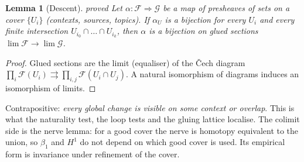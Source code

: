 \documentclass[11pt]{article}
\newtheorem{lemma}[theorem]{Lemma}
\theoremstyle{definition}
\theoremstyle{remark}
\newcommand{\st}[1]{\textsf{\small\color{gray}#1}}
\begin{document}
\begin{lemma}[Descent]\label{lem:descent}\st{proved}
Let $\alpha:\mathcal F\Rightarrow\mathcal G$ be a map of presheaves of sets on a cover $\{U_i\}$ (contexts, sources, topics). If $\alpha_{U}$ is a bijection for every $U_i$ and every finite intersection $U_{i_0}\cap\dots\cap U_{i_k}$, then $\alpha$ is a bijection on glued sections $\lim\mathcal F\to\lim\mathcal G$.
\end{lemma}
\begin{proof}
Glued sections are the limit (equaliser) of the \v{C}ech diagram $\prod_i\mathcal F(U_i)\rightrightarrows\prod_{i,j}\mathcal F(U_i\cap U_j)$. A natural isomorphism of diagrams induces an isomorphism of limits.
\end{proof}
\noindent Contrapositive: \emph{every global change is visible on some context or overlap}. This is what the naturality test, the loop tests and the gluing lattice localise. The colimit side is the nerve lemma: for a good cover the nerve is homotopy equivalent to the union, so $\beta_1$ and $H^1$ do not depend on which good cover is used. Its empirical form is invariance under refinement of the cover.
\end{document}
